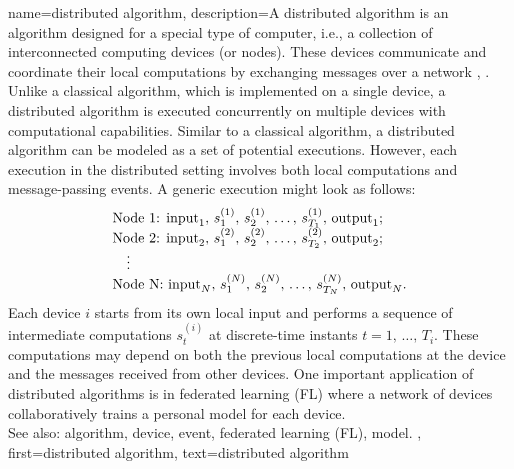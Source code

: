{
{name={distributed algorithm},
	description={A distributed algorithm is an algorithm designed for 
		a special type of computer, i.e., a collection of interconnected computing devices (or nodes). 
		These devices communicate and coordinate their local computations by exchanging 
		messages over a network \cite{IntroDistAlg}, \cite{ParallelDistrBook}. Unlike a classical algorithm, 
		which is implemented on a single device, a distributed algorithm is 
		executed concurrently on multiple devices with computational capabilities. 
		Similar to a classical algorithm, a distributed algorithm can be modeled as a 
		set of potential executions. However, each execution in the distributed setting involves 
		both local computations and message-passing events. A generic execution might look as 
		follows:
		\[
		\begin{array}{l}
			\text{Node 1: } {\rm input}_1, \,s_1^{(1)}, \,s_2^{(1)}, \,\ldots, \,s_{T_1}^{(1)}, \,{\rm output}_1; \\
			\text{Node 2: } {\rm input}_2, \,s_1^{(2)}, \,s_2^{(2)}, \,\ldots, \,s_{T_2}^{(2)}, \,{\rm output}_2; \\
			\quad \vdots \\
			\text{Node N: } {\rm input}_N, \,s_1^{(N)}, \,s_2^{(N)}, \,\ldots, \,s_{T_N}^{(N)}, \,{\rm output}_N.
		\end{array}
		\]
		Each device $i$ starts from its own local input and performs a sequence of 
		intermediate computations $s_{t}^{(i)}$ at discrete-time instants $t = 1, \,\dots, \,T_i$. 
		These computations may depend on both the previous local computations at the device 
		and the messages received from other devices. One important application of distributed 
		algorithms is in federated learning (FL) where a network of devices collaboratively trains a personal model 
		for each device. 
					\\ 
		See also: algorithm, device, event, federated learning (FL), model.
		},
	first={distributed algorithm}, 
	text={distributed algorithm}
}


}
